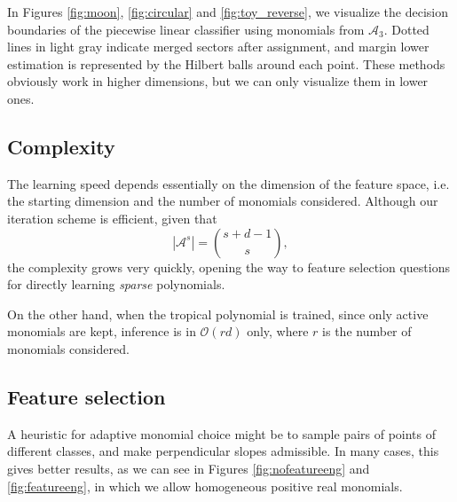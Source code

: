 \documentclass[oneside,UKenglish,a4paper]{amsart}
\numberwithin{equation}{section}
\numberwithin{figure}{section}
\theoremstyle{plain}
\theoremstyle{definition}
\theoremstyle{plain}
\theoremstyle{remark}
\theoremstyle{plain}
\theoremstyle{definition}
\theoremstyle{definition}
\begin{document}
In Figures \ref{fig:moon}, \ref{fig:circular} and \ref{fig:toy_reverse}, we visualize the decision boundaries of the piecewise linear classifier using monomials from $\mathcal{A}_3$. Dotted lines in light gray indicate merged sectors after assignment, and margin lower estimation is represented by the Hilbert balls around each point. These methods obviously work in higher dimensions, but we can only visualize them in lower ones.

\subsection*{Complexity}

The learning speed depends essentially on the dimension of the feature space, i.e. the starting dimension and the number of monomials considered. Although our iteration scheme is efficient, given that $$|\mathcal{A}^s| = \binom{s+d-1}{s},$$ the complexity grows very quickly, opening the way to feature selection questions for directly learning \emph{sparse} polynomials.

On the other hand, when the tropical polynomial is trained, since only active monomials are kept, inference is in $\mathcal{O}(rd)$ only, where $r$ is the number of monomials considered.

\subsection*{Feature selection}

A heuristic for adaptive monomial choice might be to sample pairs of points of different classes, and make perpendicular slopes admissible. In many cases, this gives better results, as we can see in Figures \ref{fig:nofeatureeng} and \ref{fig:featureeng}, in which we allow homogeneous positive real monomials.
\end{document}
